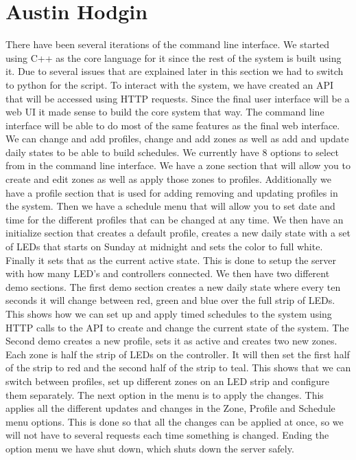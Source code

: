 \documentclass[onecolumn, draftclsnofoot,10pt, compsoc]{IEEEtran}
\begin{document}
	\section{Austin Hodgin}
	There have been several iterations of the command line interface. We started using C++ as the core language for it since the rest of the system is built using it. Due to several issues that are explained later in this section we had to switch to python for the script.  To interact with the system, we have created an API that will be accessed using HTTP requests. Since the final user interface will be a web UI it made sense to build the core system that way. The command line interface will be able to do most of the same features as the final web interface. We can change and add profiles, change and add zones as well as add and update daily states to be able to build schedules. We currently have 8 options to select from in the command line interface. We have a zone section that will allow you to create and edit zones as well as apply those zones to profiles. Additionally we have a profile section that is used for adding removing and updating profiles in the system. Then we have a schedule menu that will allow you to set date and time for the different profiles that can be changed at any time. We then have an initialize section that creates a default profile, creates a new daily state with a set of LEDs that starts on Sunday at midnight and sets the color to full white. Finally it sets that as the current active state. This is done to setup the server with how many LED’s and controllers connected. We then have two different demo sections. The first demo section creates a new daily state where every ten seconds it will change between red, green and blue over the full strip of LEDs. This shows how we can set up and apply timed schedules to the system using HTTP calls to the API to create and change the current state of the system. The Second demo creates a new profile, sets it as active and creates two new zones. Each zone is half the strip of LEDs on the controller. It will then set the first half of the strip to red and the second half of the strip to teal. This shows that we can switch between profiles, set up different zones on an LED strip and configure them separately. The next option in the menu is to apply the changes. This applies all the different updates and changes in the Zone, Profile and Schedule menu options. This is done so that all the changes can be applied at once, so we will not have to several requests each time something is changed. Ending the option menu we have shut down, which shuts down the server safely.
\end{document}
